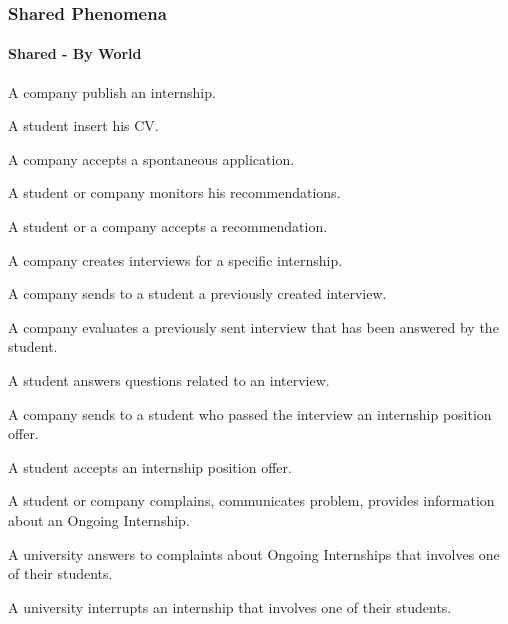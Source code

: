 \subsubsection{Shared Phenomena}
\paragraph{Shared - By World}
\begin{enumerate}[label={\color{titleColor}[SPW\arabic*]}]
\item A company publish an internship.
\item A student insert his CV.
\item A company accepts a spontaneous application.
\item A student or company monitors his recommendations.
\item A student or a company accepts a recommendation.
\item A company creates interviews for a specific internship.
\item A company sends to a student a previously created interview.
\item A company evaluates a previously sent interview that has been answered by the student.
\item A student answers questions related to an interview.
\item A company sends to a student who passed the interview an internship position offer.
\item A student accepts an internship position offer.
\item A student or company complains, communicates problem, provides information about an Ongoing Internship.
\item A university answers to complaints about Ongoing Internships that involves one of their students.
\item A university interrupts an internship that involves one of their students.
\end{enumerate}
